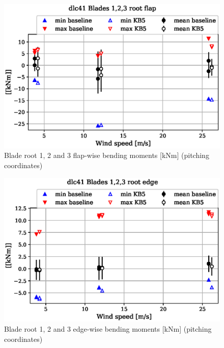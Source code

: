 \begin{figure}[!ht]
\begin{center}
	\includegraphics[width=.85\linewidth]{figures/baseline-vs-KB6/dlc41/blade1-blade1-node-001-momentvec-x_AA0007_AA0003.eps}
\end{center}
\caption{Blade root 1, 2 and 3 flap-wise bending moments [kNm] (pitching coordinates)}
\label{fig:baseline-vs-KB6:dlc41:blade-root-flap}
\end{figure}

\begin{figure}[!ht]
\begin{center}
	\includegraphics[width=.85\linewidth]{figures/baseline-vs-KB6/dlc41/blade1-blade1-node-001-momentvec-y_AA0007_AA0003.eps}
\end{center}
\caption{Blade root 1, 2 and 3 edge-wise bending moments [kNm] (pitching coordinates)}
\label{fig:baseline-vs-KB6:dlc41:blade-root-edge}
\end{figure}


